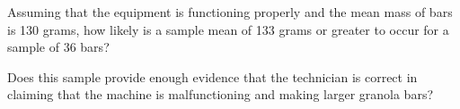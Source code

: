 \documentclass{ximera}
\begin{document}
\begin{problem}
 \begin{question}
 Assuming that the equipment is functioning properly and the mean mass of bars is 130 grams, how likely is a sample mean of 133 grams or greater to occur for a sample of 36 bars?
 \begin{multipleChoice}
 \end{multipleChoice}
 \end{question}

 \begin{question}
     Does this sample provide enough evidence that the technician is correct in claiming that the machine is malfunctioning and making larger granola bars?
     \begin{multipleChoice}
 \end{multipleChoice}
 \end{question}

 \end{problem}
\end{document}
